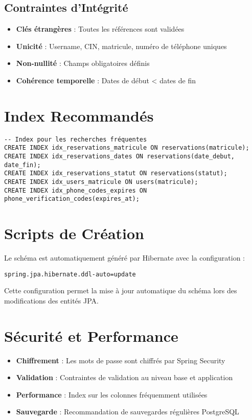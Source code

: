 \documentclass[12pt,a4paper]{article}
\begin{document}
\subsection{Contraintes d'Intégrité}

\begin{itemize}
    \item \textbf{Clés étrangères} : Toutes les références sont validées
    \item \textbf{Unicité} : Username, CIN, matricule, numéro de téléphone uniques
    \item \textbf{Non-nullité} : Champs obligatoires définis
    \item \textbf{Cohérence temporelle} : Dates de début < dates de fin
\end{itemize}

\section{Index Recommandés}

\begin{lstlisting}[caption=Index pour les recherches fréquentes]
-- Index pour les recherches fréquentes
CREATE INDEX idx_reservations_matricule ON reservations(matricule);
CREATE INDEX idx_reservations_dates ON reservations(date_debut, date_fin);
CREATE INDEX idx_reservations_statut ON reservations(statut);
CREATE INDEX idx_users_matricule ON users(matricule);
CREATE INDEX idx_phone_codes_expires ON phone_verification_codes(expires_at);
\end{lstlisting}

\section{Scripts de Création}

Le schéma est automatiquement généré par Hibernate avec la configuration :
\begin{lstlisting}[caption=Configuration Hibernate]
spring.jpa.hibernate.ddl-auto=update
\end{lstlisting}

Cette configuration permet la mise à jour automatique du schéma lors des modifications des entités JPA.

\section{Sécurité et Performance}

\begin{itemize}
    \item \textbf{Chiffrement} : Les mots de passe sont chiffrés par Spring Security
    \item \textbf{Validation} : Contraintes de validation au niveau base et application
    \item \textbf{Performance} : Index sur les colonnes fréquemment utilisées
    \item \textbf{Sauvegarde} : Recommandation de sauvegardes régulières PostgreSQL
\end{itemize}
\end{document}
